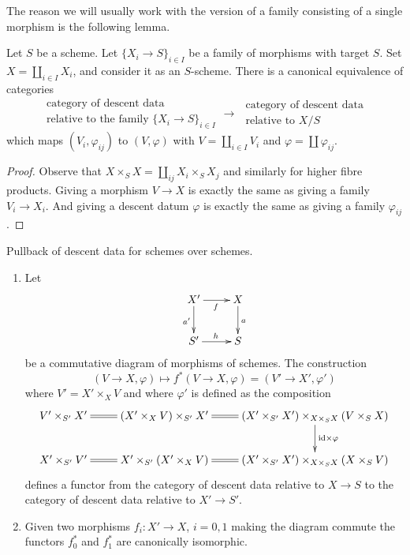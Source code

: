 \noindent
The reason we will usually work with the version of a family consisting
of a single morphism is the following lemma.

\begin{lemma}
\label{lemma-family-is-one}
Let $S$ be a scheme.
Let $\{X_i \to S\}_{i \in I}$ be a family of morphisms with target $S$.
Set $X = \coprod_{i \in I} X_i$, and consider it as an $S$-scheme.
There is a canonical equivalence of categories
$$
\begin{matrix}
\text{category of descent data } \\
\text{relative to the family } \{X_i \to S\}_{i \in I}
\end{matrix}
\longrightarrow
\begin{matrix}
\text{ category of descent data} \\
\text{ relative to } X/S
\end{matrix}
$$
which maps $(V_i, \varphi_{ij})$ to $(V, \varphi)$ with
$V = \coprod_{i\in I} V_i$ and $\varphi = \coprod \varphi_{ij}$.
\end{lemma}

\begin{proof}
Observe that $X \times_S X = \coprod_{ij} X_i \times_S X_j$
and similarly for higher fibre products.
Giving a morphism $V \to X$ is exactly the same as
giving a family $V_i \to X_i$. And giving a descent datum
$\varphi$ is exactly the same as giving a family $\varphi_{ij}$.
\end{proof}

\begin{lemma}
\label{lemma-pullback}
Pullback of descent data for schemes over schemes.
\begin{enumerate}
\item Let
$$
\xymatrix{
X' \ar[r]_f \ar[d]_{a'} & X \ar[d]^a \\
S' \ar[r]^h & S
}
$$
be a commutative diagram of morphisms of schemes.
The construction
$$
(V \to X, \varphi) \longmapsto f^*(V \to X, \varphi) = (V' \to X', \varphi')
$$
where $V' = X' \times_X V$ and where
$\varphi'$ is defined as the composition
$$
\xymatrix{
V' \times_{S'} X' \ar@{=}[r] &
(X' \times_X V) \times_{S'} X' \ar@{=}[r] &
(X' \times_{S'} X') \times_{X \times_S X} (V \times_S X)
\ar[d]^{\text{id} \times \varphi} \\
X' \times_{S'} V' \ar@{=}[r] &
X' \times_{S'} (X' \times_X V) &
(X' \times_{S'} X') \times_{X \times_S X} (X \times_S V) \ar@{=}[l]
}
$$
defines a functor from the category of descent data
relative to $X \to S$ to the category of descent data
relative to $X' \to S'$.
\item Given two morphisms $f_i : X' \to X$, $i = 0, 1$ making the
diagram commute the functors $f_0^*$ and $f_1^*$ are
canonically isomorphic.
\end{enumerate}
\end{lemma}

